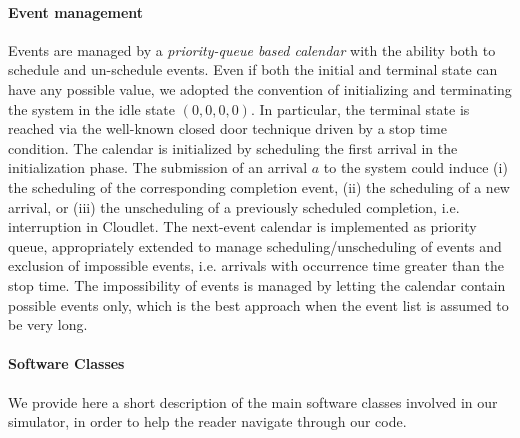 \paragraph{Event management}
Events are managed by a \textit{priority-queue based calendar} with the ability both to schedule and un-schedule events.
%
Even if both the initial and terminal state can have any possible value, we adopted the convention of initializing and terminating the system in the idle state $(0,0,0,0)$. In particular, the terminal state is reached via the well-known closed door technique driven by a stop time condition.
%
The calendar is initialized by scheduling the first arrival in the initialization phase. The submission of an arrival $a$ to the system could induce
(i) the scheduling of the corresponding completion event,
(ii) the scheduling of a new arrival, or
(iii) the unscheduling of a previously scheduled completion, i.e. interruption in Cloudlet.
%
The next-event calendar is implemented as priority queue, appropriately extended to manage scheduling/unscheduling of events and exclusion of impossible events, i.e. arrivals with occurrence time greater than the stop time.
%
The impossibility of events is managed by letting the calendar contain possible events only, which is the best approach when the event list is assumed to be very long.

\paragraph{Software Classes}
We provide here a short description of the main software classes involved in our simulator, in order to help the reader navigate through our code.

